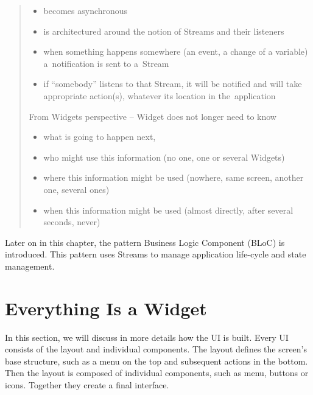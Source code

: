 \begin{quote}
    \begin{itemize}
        \item becomes asynchronous
        \item is architectured around the notion of Streams and their listeners
        \item when something happens somewhere (an event, a change of a variable) a~notification is sent to a~Stream
        \item if ``somebody'' listens to that Stream, it will be notified and will take appropriate action(s), whatever its location in the~application
    \end{itemize}
    
    From Widgets perspective -- Widget does not longer need to know
    
    \begin{itemize}
        \item what is going to happen next,
        \item who might use this information (no one, one or several Widgets)
        \item where this information might be used (nowhere, same screen, another one, several ones)
        \item when this information might be used (almost directly, after several seconds, never)
    \end{itemize}
\end{quote}

Later on in this chapter, the pattern Business Logic Component (BLoC) is introduced. This pattern uses Streams to manage application life-cycle and state management. 
\section{Everything Is a Widget}
In this section, we will discuss in more details how the UI is built. Every UI consists of the layout and individual components. The layout defines the screen's base structure, such as a menu on the top and subsequent actions in the bottom. Then the layout is composed of individual components, such as menu, buttons or icons. Together they create a final interface.

